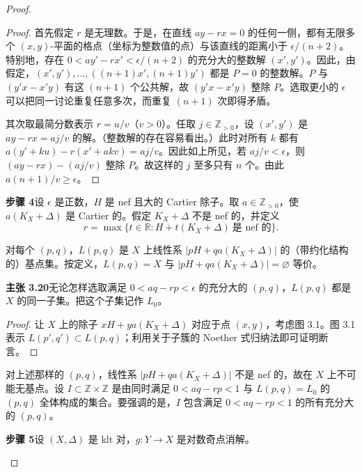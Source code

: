 \begin{proof}
\begin{proof}
首先假定 $r$ 是无理数。于是，在直线 $ay-rx=0$ 的任何一侧，都有无限多个 $(x,y)$-平面的格点（坐标为整数值的点）与该直线的距离小于 $\epsilon/(n+2)$。特别地，存在 $0<ay'-rx'<\epsilon/(n+2)$ 的充分大的整数解 $(x',y')$。因此，由假定，$(x',y'),\dots,((n+1)x',(n+1)y')$ 都是 $P=0$ 的整数解。$P$ 与 $(y'x-x'y)$ 有这 $(n+1)$ 个公共解，故 $(y'x-x'y)$ 整除 $P$。选取更小的 $\epsilon$ 可以把同一讨论重复任意多次，而重复 $(n+1)$ 次即得矛盾。

其次取最简分数表示 $r=u/v$（$v>0$）。任取 $j\in\mathbb{Z}_{>0}$，设 $(x',y')$ 是 $ay-rx=aj/v$ 的解。（整数解的存在容易看出。）此时对所有 $k$ 都有 $a(y'+ku)-r(x'+akv)=aj/v$。因此如上所见，若 $aj/v<\epsilon$，则 $(ay-rx)-(aj/v)$ 整除 $P$。故这样的 $j$ 至多只有 $n$ 个。由此 $a(n+1)/v\geq\epsilon$。
\end{proof}

\par\medskip\noindent\textbf{步骤 4}\quad 设 $\epsilon$ 是正数，$H$ 是 nef 且大的 Cartier 除子。取 $a\in\mathbb{Z}_{>0}$，使 $a(K_X+\Delta)$ 是 Cartier 的。假定 $K_X+\Delta$ 不是 nef 的，并定义
\[
r=\max\{t\in\mathbb{R}:H+t(K_X+\Delta)\ \text{是 nef 的}\}.
\]

对每个 $(p,q)$，$L(p,q)$ 是 $X$ 上线性系 $|pH+qa(K_X+\Delta)|$ 的（带约化结构的）基点集。按定义，$L(p,q)=X$ 与 $|pH+qa(K_X+\Delta)|=\varnothing$ 等价。

\par\medskip\noindent\textbf{主张 3.20}\quad 无论怎样选取满足 $0<aq-rp<\epsilon$ 的充分大的 $(p,q)$，$L(p,q)$ 都是 $X$ 的同一子集。把这个子集记作 $L_0$。

\begin{proof}
让 $X$ 上的除子 $xH+ya(K_X+\Delta)$ 对应于点 $(x,y)$，考虑图 3.1。图 3.1 表示 $L(p',q')\subset L(p,q)$；利用关于子簇的 Noether 式归纳法即可证明断言。
\end{proof}

对上述那样的 $(p,q)$，线性系 $|pH+qa(K_X+\Delta)|$ 不是 nef 的，故在 $X$ 上不可能无基点。设 $I\subset\mathbb{Z}\times\mathbb{Z}$ 是由同时满足 $0<aq-rp<1$ 与 $L(p,q)=L_0$ 的 $(p,q)$ 全体构成的集合。要强调的是，$I$ 包含满足 $0<aq-rp<1$ 的所有充分大的 $(p,q)$。

\par\medskip\noindent\textbf{步骤 5}\quad 设 $(X,\Delta)$ 是 klt 对，$g:Y\to X$ 是对数奇点消解。

\begin{figure}[htbp]
\centering
\resizebox{0.80\textwidth}{!}{}
\end{figure}


\end{proof}
